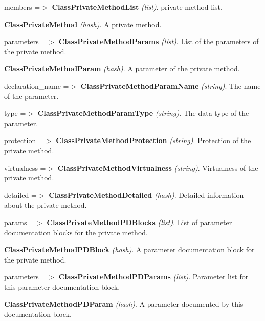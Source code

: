 \begin{DoxyItemize}
\begin{DoxyItemize}
\begin{DoxyItemize}
\begin{DoxyItemize}
\begin{DoxyItemize}
\item members =$>$ {\bfseries ClassPrivateMethodList} {\itshape (list)\/}. private method list. 
\begin{DoxyItemize}
\item {\bfseries ClassPrivateMethod} {\itshape (hash)\/}. A private method. 
\begin{DoxyItemize}
\item parameters =$>$ {\bfseries ClassPrivateMethodParams} {\itshape (list)\/}. List of the parameters of the private method. 
\begin{DoxyItemize}
\item {\bfseries ClassPrivateMethodParam} {\itshape (hash)\/}. A parameter of the private method. 
\begin{DoxyItemize}
\item declaration\_\-name =$>$ {\bfseries ClassPrivateMethodParamName} {\itshape (string)\/}. The name of the parameter. 
\item type =$>$ {\bfseries ClassPrivateMethodParamType} {\itshape (string)\/}. The data type of the parameter. 
\end{DoxyItemize}
\end{DoxyItemize}
\item protection =$>$ {\bfseries ClassPrivateMethodProtection} {\itshape (string)\/}. Protection of the private method. 
\item virtualness =$>$ {\bfseries ClassPrivateMethodVirtualness} {\itshape (string)\/}. Virtualness of the private method. 
\item detailed =$>$ {\bfseries ClassPrivateMethodDetailed} {\itshape (hash)\/}. Detailed information about the private method. 
\begin{DoxyItemize}
\item params =$>$ {\bfseries ClassPrivateMethodPDBlocks} {\itshape (list)\/}. List of parameter documentation blocks for the private method. 
\begin{DoxyItemize}
\item {\bfseries ClassPrivateMethodPDBlock} {\itshape (hash)\/}. A parameter documentation block for the private method. 
\begin{DoxyItemize}
\item parameters =$>$ {\bfseries ClassPrivateMethodPDParams} {\itshape (list)\/}. Parameter list for this parameter documentation block. 
\begin{DoxyItemize}
\item {\bfseries ClassPrivateMethodPDParam} {\itshape (hash)\/}. A parameter documented by this documentation block. 

\end{DoxyItemize}
\end{DoxyItemize}
\end{DoxyItemize}
\end{DoxyItemize}
\end{DoxyItemize}
\end{DoxyItemize}
\end{DoxyItemize}
\end{DoxyItemize}
\end{DoxyItemize}
\end{DoxyItemize}
\end{DoxyItemize}
